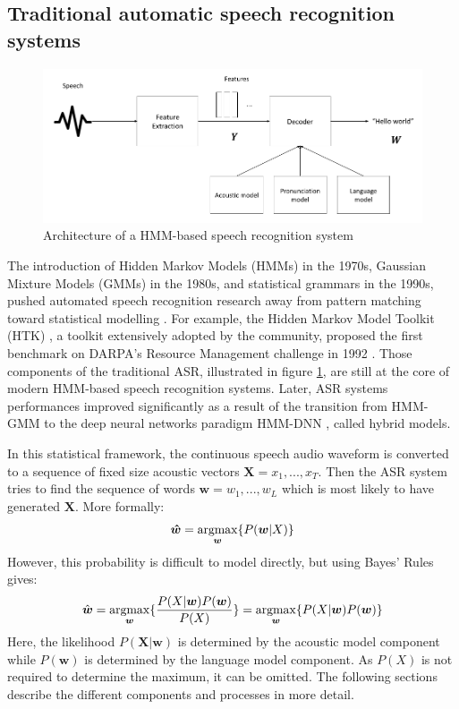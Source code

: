 \subsection{Traditional automatic speech recognition systems} %
\begin{figure}
\includegraphics[width=\textwidth]{imgs/HMM-GMM architecture.png}
\caption{Architecture of a HMM-based speech recognition system}
\label{HMM-GMM-model}
\end{figure}
The introduction of Hidden Markov Models (HMMs) in the 1970s, Gaussian Mixture Models (GMMs) in the 1980s, and statistical grammars in the 1990s, pushed automated speech recognition research away from pattern matching toward statistical modelling \cite{first_asr}. For example, the Hidden Markov Model Toolkit (HTK) \cite{htk_book}, a toolkit extensively adopted by the community, proposed the first benchmark on DARPA's Resource Management challenge in 1992  \cite{darpa1992}. Those components of the traditional ASR, illustrated in figure \ref{HMM-GMM-model}, are still at the core of modern HMM-based speech recognition systems. Later, ASR systems performances improved significantly as a result of the transition from HMM-GMM to the deep neural networks paradigm HMM-DNN  \cite{hmm-dnn}, called hybrid models.

In this statistical framework, the continuous speech audio waveform is converted to a sequence of fixed size acoustic vectors $\boldsymbol{X}=x_1,...,x_T$. Then the ASR system tries to find the sequence of words $\boldsymbol{w}=w_1,...,w_L$ which is most likely to have generated $\boldsymbol{X}$. More formally:
\begin{equation} \label{equation:asr_0}
    \boldsymbol{\hat{w}} = \operatorname*{argmax}_{\boldsymbol{w}} \{P(\boldsymbol{w}|X)\}
\end{equation}
However, this probability is difficult to model directly, but using Bayes' Rules gives:
\begin{equation}  \label{equation:asr}
    \hat{\boldsymbol{w}} = \operatorname*{argmax}_{\boldsymbol{w}} \{\frac{P(X|\boldsymbol{w})P(\boldsymbol{w})}{P(X)}\} =\operatorname*{argmax}_{\boldsymbol{w}} \{P(X|\boldsymbol{w})P(\boldsymbol{w})\}
\end{equation}
Here, the likelihood $P(\boldsymbol{X}|\boldsymbol{w})$ is determined by the acoustic model component while $P(\boldsymbol{w})$ is determined by the language model component.  As $P(X)$ is not required to determine the maximum, it can be omitted. The following sections describe the different components and processes in more detail.


